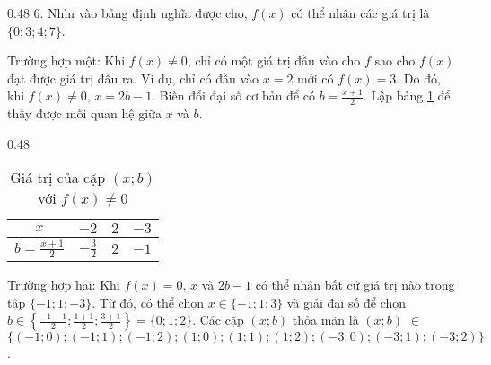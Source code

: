 {
   \begin{minipageindent}{0.48\textwidth}
      6. Nhìn vào bảng định nghĩa được cho, $f(x)$ có thể nhận các giá trị là $\{0; 3; 4; 7\}$.

      \textcolor{colorEmphasis}{Trường hợp một}: Khi $f(x) \neq 0$, chỉ có một giá trị đầu vào cho $f$ sao cho $f(x)$ đạt được giá trị đầu ra. Ví dụ, chỉ có đầu vào $x = 2$ mới có $f(x) = 3$. Do đó, khi $f(x) \neq 0$, $x = 2b-1$. Biến đổi đại số cơ bản để có $b = \frac{x + 1}{2}$. Lập bảng \ref{tab:ham_so_mot_bien:dinh_nghia:b_values7} để thấy được mối quan hệ giữa $x$ và $b$.

   \end{minipageindent}
   \hfill
   \begin{minipageindent}{0.48\textwidth}
      \begin{table}[H]
         \centering
         \begin{tabular}{|c|c|c|c|}
            \hline
            $x$ & $-2$ & $2$ & $-3$\\
            \hline
            $b = \frac{x+1}{2}$ & $-\frac{3}{2}$ & $2$ & $-1$\\
            \hline
         \end{tabular}
         \caption{Giá trị của cặp $(x; b)$ với $f(x) \neq 0$}
         \label{tab:ham_so_mot_bien:dinh_nghia:b_values7}
      \end{table}
   \end{minipageindent}
}

\textcolor{colorEmphasisCyan}{Trường hợp hai}: Khi $f(x) = 0$, $x$ và $2b-1$ có thể nhận bất cứ giá trị nào trong tập $\{-1; 1; -3\}$. Từ đó, có thể chọn $x \in \{-1; 1; 3\}$ và giải đại số để chọn $b \in \left\{\frac{-1+1}{2}; \frac{1+1}{2}; \frac{3+1}{2}\right\} = \{0; 1; 2\}$. Các cặp $(x; b)$ thỏa mãn là $(x; b)$ $\in$ $\{\left(-1; 0\right); \left(-1; 1\right); \left(-1; 2\right); \left(1; 0\right); \left(1; 1\right); \left(1; 2\right); \left(-3; 0\right); \left(-3; 1\right); \left(-3; 2\right)\}$.

